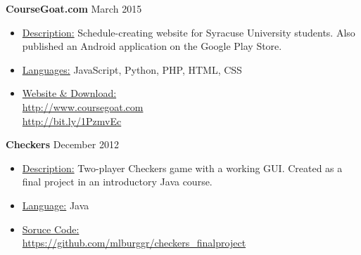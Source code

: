 \documentclass[margin]{res}
\begin{document}
\begin{resume}
{\bf CourseGoat.com} \hfill March 2015
\begin{itemize}
 \item \underline{Description:} Schedule-creating website for Syracuse University students. Also published an Android application on the Google Play Store.\
 \item \underline{Languages:} JavaScript, Python, PHP, HTML, CSS
 \item \underline{Website \& Download:} \\ \url{http://www.coursegoat.com}
 \\ \url{http://bit.ly/1PzmvEc}
 
\end{itemize}

{\bf Checkers} \hfill December 2012
\begin{itemize}
 \item \underline{Description:} Two-player Checkers game with a working GUI. Created as a final project in an introductory Java course.\
 \item \underline{Language:} Java
 \item \underline{Soruce Code:} \\
 \url{https://github.com/mlburggr/checkers_finalproject}\
\end{itemize}




\end{resume} 
\end{document}
